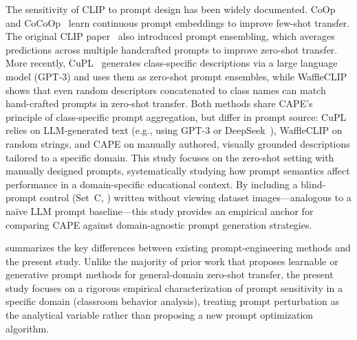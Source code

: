 \documentclass[symmetry,article,submit,pdftex,moreauthors]{Definitions/mdpi}
\begin{document}
The sensitivity of CLIP to prompt design has been widely documented.
CoOp~\cite{zhou2022learning} and CoCoOp~\cite{zhou2022conditional} learn continuous prompt embeddings to improve few-shot transfer.
The original CLIP paper~\cite{radford2021learning} also introduced prompt ensembling, which averages predictions across multiple handcrafted prompts to improve zero-shot transfer.
More recently, CuPL~\cite{pratt2023cupl} generates class-specific descriptions via a large language model (GPT-3) and uses them as zero-shot prompt ensembles, while WaffleCLIP~\cite{roth2023waffleclip} shows that even random descriptors concatenated to class names can match hand-crafted prompts in zero-shot transfer.
Both methods share CAPE's principle of class-specific prompt aggregation, but differ in prompt source: CuPL relies on LLM-generated text (e.g., using GPT-3 or DeepSeek~\cite{deng2025deepseek}), WaffleCLIP on random strings, and CAPE on manually authored, visually grounded descriptions tailored to a specific domain.
This study focuses on the zero-shot setting with manually designed prompts, systematically studying how prompt semantics affect performance in a domain-specific educational context.
By including a blind-prompt control (Set~C, ) written without viewing dataset images---analogous to a na\"ive LLM prompt baseline---this study provides an empirical anchor for comparing CAPE against domain-agnostic prompt generation strategies.

 summarizes the key differences between existing prompt-engineering methods and the present study.
Unlike the majority of prior work that proposes learnable or generative prompt methods for general-domain zero-shot transfer, the present study focuses on a rigorous empirical characterization of prompt sensitivity in a specific domain (classroom behavior analysis), treating prompt perturbation as the analytical variable rather than proposing a new prompt optimization algorithm.
\end{document}
